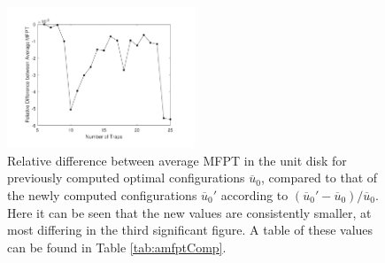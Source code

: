\documentclass[11pt,letter,subeqn,fleqn]{article}
\newcommand{\amfpt}{\overline{u}_0} %
\begin{document}
\begin{figure}[H]
\centering
\includegraphics[width=0.5\textwidth]{RelativeDifference}
\caption{Relative difference between average MFPT in the unit disk for previously computed optimal configurations $\amfpt$, compared to that of the newly computed configurations $\amfpt'$ according to $(\amfpt' - \amfpt)/\amfpt$. Here it can be seen that the new values are consistently smaller, at most differing in the third significant figure. A table of these values can be found in Table \ref{tab:amfptComp}.}
\label{fig:amfptComp}
\end{figure}
\end{document}
